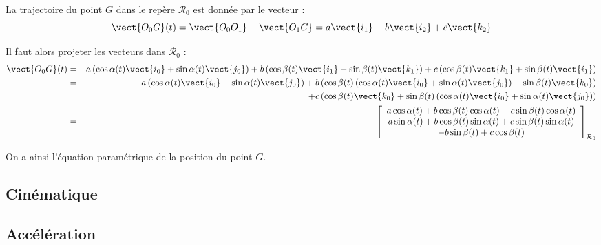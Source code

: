 \ifprof
\begin{corrige}
La trajectoire du point $G$ dans le repère $\mathcal{R}_0$  est donnée par le vecteur :
$$
\vect{O_0 G}(t)  = \vect{O_0O_1} + \vect{O_1G}
= a \vect{i_1} +  b \vect{i_2} + c \vect{k_2}
$$

Il faut alors projeter les vecteurs dans $\mathcal{R}_0$ : 
\begin{eqnarray*}
\vect{O_0 G}(t) &=& a \left(\cos\alpha(t) \vect{i_0} + \sin\alpha(t) \vect{j_0} \right) 
+ b \left(\cos\beta(t) \vect{i_1} - \sin\beta(t) \vect{k_1} \right) 
+ c\left(\cos\beta(t) \vect{k_1} + \sin\beta(t)\vect{i_1}\right)\\
&=& a \left(\cos\alpha(t) \vect{i_0} + \sin\alpha(t) \vect{j_0} \right) 
+ b \left(\cos\beta(t) \left(\cos\alpha(t) \vect{i_0} + \sin\alpha(t) \vect{j_0} \right) - \sin\beta(t) \vect{k_0} \right) \\
&& + c\left(\cos\beta(t) \vect{k_0} + \sin\beta(t)  \left(\cos\alpha(t) \vect{i_0} + \sin\alpha(t) \vect{j_0} \right) \right)\\
&=& \left[ \begin{array}{c} 
a \cos\alpha(t) + b \cos\beta(t) \cos\alpha(t) +c \sin\beta(t)\cos\alpha(t)\\
a \sin\alpha(t) + b \cos\beta(t) \sin\alpha(t) +c \sin\beta(t)\sin\alpha(t) \\
- b\sin\beta(t) + c\cos\beta(t)
\end{array}\right]_{\mathcal{R}_0}
\end{eqnarray*}

On a ainsi l'équation paramétrique de la position du point $G$.

\end{corrige}
\else \fi


\subsection*{Cinématique}
%
%




%

\subsection*{Accélération}

